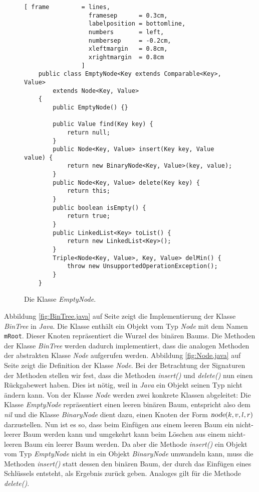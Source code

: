 \begin{figure}[!ht]
  \centering
\begin{Verbatim}[ frame         = lines, 
                  framesep      = 0.3cm, 
                  labelposition = bottomline,
                  numbers       = left,
                  numbersep     = -0.2cm,
                  xleftmargin   = 0.8cm,
                  xrightmargin  = 0.8cm
                ]
    public class EmptyNode<Key extends Comparable<Key>, Value> 
        extends Node<Key, Value>
    {
        public EmptyNode() {}
        
        public Value find(Key key) {
            return null;
        }        
        public Node<Key, Value> insert(Key key, Value value) {
            return new BinaryNode<Key, Value>(key, value);
        }        
        public Node<Key, Value> delete(Key key) {
            return this;
        }
        public boolean isEmpty() {
            return true;
        }    
        public LinkedList<Key> toList() {
            return new LinkedList<Key>();
        }
        Triple<Node<Key, Value>, Key, Value> delMin() {
            throw new UnsupportedOperationException();
        }
    }
\end{Verbatim}
\vspace*{-0.3cm}
  \caption{Die Klasse \textsl{EmptyNode}.}
  \label{fig:EmptyNode.java}
\end{figure}

Abbildung \ref{fig:BinTree.java} auf Seite \pageref{fig:BinTree.java} zeigt die 
Implementierung der Klasse \textsl{BinTree} in \textsl{Java}.  Die Klasse enth\"alt ein
Objekt vom Typ \textsl{Node} mit dem Namen \texttt{mRoot}.  Dieser Knoten repr\"asentiert
die Wurzel des bin\"aren Baums.  Die Methoden der Klasse \textsl{BinTree} werden dadurch
implementiert, dass die analogen Methoden der abstrakten Klasse \textsl{Node} aufgerufen
werden.  
Abbildung \ref{fig:Node.java} auf Seite \pageref{fig:Node.java} zeigt die Definition
der Klasse \textsl{Node}.  Bei der Betrachtung der Signaturen der Methoden stellen wir
fest, dass die Methoden \textsl{insert()} und \textsl{delete()} nun einen R\"uckgabewert
haben.   Dies ist n\"otig, weil in \textsl{Java} ein Objekt seinen Typ nicht \"andern kann.  
Von der Klasse \textsl{Node} werden zwei konkrete Klassen abgeleitet:  Die Klasse
\textsl{EmptyNode} repr\"asentiert einen leeren bin\"aren Baum, entspricht also dem
\textsl{nil} und die Klasse \textsl{BinaryNode} dient dazu, einen Knoten der Form
$\textsl{node}(k,v,l,r)$ darzustellen.  Nun ist es so, dass beim Einf\"ugen  aus
einem leeren Baum ein nicht-leerer Baum werden kann und umgekehrt kann beim L\"oschen 
aus einem nicht-leeren Baum ein leerer Baum werden.  Da aber die Methode \textsl{insert()}
ein Objekt vom Typ \textsl{EmptyNode} nicht in ein Objekt \textsl{BinaryNode} umwandeln
kann, muss die Methoden \textsl{insert()} statt dessen den bin\"aren Baum, der durch das
Einf\"ugen eines Schl\"ussels entsteht, als  Ergebnis zur\"uck geben.  Analoges gilt f\"ur die
Methode \textsl{delete()}.

